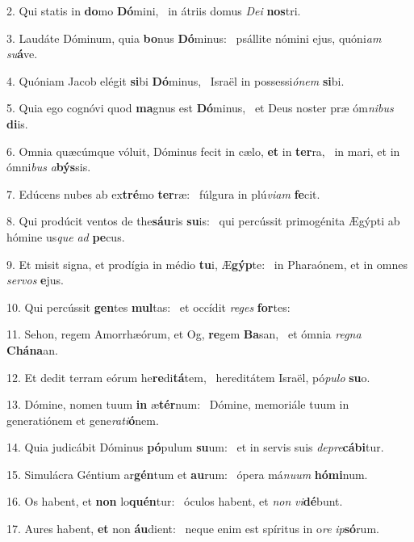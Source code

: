 2. Qui statis in \textbf{do}mo \textbf{Dó}mini, \ast\  in átriis domus \textit{De}\textit{i} \textbf{nos}tri.\

3. Laudáte Dóminum, quia \textbf{bo}nus \textbf{Dó}minus: \ast\  psállite nómini ejus, quóni\textit{am} \textit{su}\textbf{á}ve.\

4. Quóniam Jacob elégit \textbf{si}bi \textbf{Dó}minus, \ast\  Israël in possessi\textit{ó}\textit{nem} \textbf{si}bi.\

5. Quia ego cognóvi quod \textbf{ma}gnus est \textbf{Dó}minus, \ast\  et Deus noster præ óm\textit{ni}\textit{bus} \textbf{di}is.\

6. Omnia quæcúmque vóluit, Dóminus fecit in cælo, \textbf{et} in \textbf{ter}ra, \ast\  in mari, et in ómni\textit{bus} \textit{a}\textbf{býs}sis.\

7. Edúcens nubes ab ex\textbf{tré}mo \textbf{ter}ræ: \ast\  fúlgura in plú\textit{vi}\textit{am} \textbf{fe}cit.\

8. Qui prodúcit ventos de the\textbf{sáu}ris \textbf{su}is: \ast\  qui percússit primogénita Ægýpti ab hómine us\textit{que} \textit{ad} \textbf{pe}cus.\

9. Et misit signa, et prodígia in médio \textbf{tu}i, Æ\textbf{gýp}te: \ast\  in Pharaónem, et in omnes \textit{ser}\textit{vos} \textbf{e}jus.\

10. Qui percússit \textbf{gen}tes \textbf{mul}tas: \ast\  et occídit \textit{re}\textit{ges} \textbf{for}tes:\

11. Sehon, regem Amorrhæórum, et Og, \textbf{re}gem \textbf{Ba}san, \ast\  et ómnia \textit{re}\textit{gna} \textbf{Chá}\textbf{na}an.\

12. Et dedit terram eórum he\textbf{re}di\textbf{tá}tem, \ast\  hereditátem Israël, pó\textit{pu}\textit{lo} \textbf{su}o.\

13. Dómine, nomen tuum \textbf{in} æ\textbf{tér}num: \ast\  Dómine, memoriále tuum in generatiónem et gene\textit{ra}\textit{ti}\textbf{ó}nem.\

14. Quia judicábit Dóminus \textbf{pó}pulum \textbf{su}um: \ast\  et in servis suis \textit{de}\textit{pre}\textbf{cá}\textbf{bi}tur.\

15. Simulácra Géntium ar\textbf{gén}tum et \textbf{au}rum: \ast\  ópera má\textit{nu}\textit{um} \textbf{hó}\textbf{mi}num.\

16. Os habent, et \textbf{non} lo\textbf{quén}tur: \ast\  óculos habent, et \textit{non} \textit{vi}\textbf{dé}bunt.\

17. Aures habent, \textbf{et} non \textbf{áu}dient: \ast\  neque enim est spíritus in o\textit{re} \textit{ip}\textbf{só}rum.\

